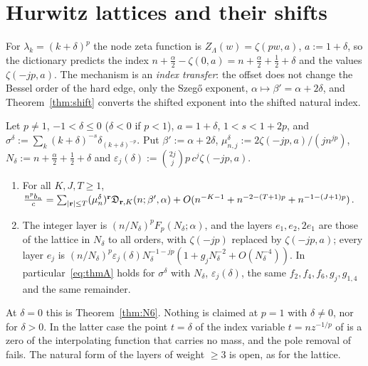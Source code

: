\section{Hurwitz lattices and their shifts}\label{sec:hurwitz}

For $\lambda_k=(k+\delta)^p$ the node zeta function is $Z_\Lambda(w)=\zeta(pw,a)$, $a:=1+\delta$, so the dictionary predicts the index
$n+\frac\alpha2-\zeta(0,a)=n+\frac\alpha2+\frac12+\delta$ and the values $\zeta(-jp,a)$. The mechanism is an \emph{index transfer}: the offset
does not change the Bessel order of the hard edge, only the Szeg\H{o} exponent, $\alpha\mapsto\beta'=\alpha+2\delta$, and
Theorem~\ref{thm:shift} converts the shifted exponent into the shifted natural index.

\begin{theorem}\label{thm:H}
Let $p\ne1$, $-1<\delta\le0$ ($\delta<0$ if $p<1$), $a=1+\delta$, $1<s<1+2p$, and $\sigma^\delta:=\sum_k(k+\delta)^{-s}\delta_{(k+\delta)^{-p}}$. Put
$\beta':=\alpha+2\delta$, $\mu^\delta_{n,j}:=2\zeta(-jp,a)/(jn^{jp})$, $N_\delta:=n+\frac\alpha2+\frac12+\delta$ and
$\varepsilon_j(\delta):=\binom{2j}jp\,c^j\zeta(-jp,a)$.
\begin{enumerate}
\item[(i)] For all $K,J,T\ge1$,
$\frac{n^pb_n}c=\sum_{|\mathbf r|\le T}(\mu^\delta_n)^{\mathbf r}\mathfrak D_{\mathbf r,K}(n;\beta',\alpha)+O(n^{-K-1}+n^{-2-(T+1)p}+n^{-1-(J+1)p})$.
\item[(ii)] The integer layer is $(n/N_\delta)^pF_p(N_\delta;\alpha)$, and the layers $e_1,e_2,2e_1$ are those of the lattice in $N_\delta$ to all
orders, with $\zeta(-jp)$ replaced by $\zeta(-jp,a)$; every layer $e_j$ is $(n/N_\delta)^p\varepsilon_j(\delta)N_\delta^{-1-jp}(1+g_jN_\delta^{-2}+O(N_\delta^{-4}))$.
In particular~\eqref{eq:thmA} holds for $\sigma^\delta$ with $N_\delta$, $\varepsilon_j(\delta)$, the same $f_2,f_4,f_6,g_j,g_{1,4}$ and the same remainder.
\end{enumerate}
\end{theorem}

At $\delta=0$ this is Theorem~\ref{thm:N6}. Nothing is claimed at $p=1$ with $\delta\ne0$, nor for $\delta>0$. In the latter case the point $t=\delta$ of the index variable
$t=nz^{-1/p}$ of \cite{PaperII} is a zero of the interpolating function that carries no mass, and the pole removal of
\cite[Section~5]{PaperII} fails. The natural form of the layers of weight $\ge3$ is open, as for the lattice.

